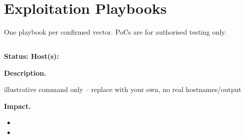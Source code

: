 \section{Exploitation Playbooks}\label{sec:playbooks}
One playbook per confirmed vector. PoCs are for authorised testing only.

\subsection{}
\textbf{Status: \confirmed\quad Host(s): }

\textbf{Description.} 
\begin{codebox}
illustrative command only -- replace with your own, no real hostnames/output
\end{codebox}

\textbf{Impact.} 

\begin{mitigationbox}
\begin{itemize}
  \item {}
  \item {}
\end{itemize}
\end{mitigationbox}

